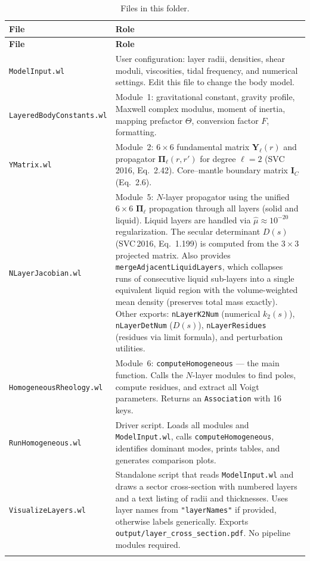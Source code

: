\documentclass[11pt]{article}
\begin{document}
\begin{longtable}{@{}lp{8.5cm}@{}}
\toprule
\textbf{File} & \textbf{Role} \\
\midrule
\endfirsthead
\toprule
\textbf{File} & \textbf{Role} \\
\midrule
\endhead
\texttt{ModelInput.wl} &
  User configuration: layer radii, densities, shear moduli,
  viscosities, tidal frequency, and numerical settings.  Edit this
  file to change the body model. \\[4pt]
\texttt{LayeredBodyConstants.wl} &
  Module~1: gravitational constant, gravity profile, Maxwell complex
  modulus, moment of inertia, mapping prefactor $\Theta$, conversion
  factor $F$, formatting. \\[4pt]
\texttt{YMatrix.wl} &
  Module~2: $6\times6$ fundamental matrix $\mathbf{Y}_\ell(r)$
  and propagator $\mathbf{\Pi}_\ell(r,r')$ for degree
  $\ell=2$ (SVC\,2016, Eq.~2.42).  Core--mantle boundary matrix
  $\mathbf{I}_C$ (Eq.~2.6). \\[4pt]
\texttt{NLayerJacobian.wl} &
  Module~5: $N$-layer propagator using the unified $6\times6$
  $\mathbf{\Pi}_\ell$ propagation through all layers (solid and
  liquid).  Liquid layers are handled via $\hat\mu \approx 10^{-20}$
  regularization.  The secular determinant $D(s)$
  (SVC\,2016, Eq.~1.199) is computed from the $3\times3$ projected
  matrix.  Also provides \texttt{mergeAdjacentLiquidLayers}, which
  collapses runs of consecutive liquid sub-layers into a single
  equivalent liquid region with the volume-weighted mean density
  (preserves total mass exactly).  Other exports:
  \texttt{nLayerK2Num} (numerical $k_2(s)$),
  \texttt{nLayerDetNum} ($D(s)$), \texttt{nLayerResidues}
  (residues via limit formula), and perturbation utilities. \\[4pt]
\texttt{HomogeneousRheology.wl} &
  Module~6: \texttt{computeHomogeneous} --- the main function.  Calls
  the $N$-layer modules to find poles, compute residues, and extract
  all Voigt parameters.  Returns an \texttt{Association} with 16
  keys. \\[4pt]
\texttt{RunHomogeneous.wl} &
  Driver script.  Loads all modules and \texttt{ModelInput.wl},
  calls \texttt{computeHomogeneous}, identifies dominant modes, prints
  tables, and generates comparison plots. \\[4pt]
\texttt{VisualizeLayers.wl} &
  Standalone script that reads \texttt{ModelInput.wl} and draws a
  sector cross-section with numbered layers and a text listing of
  radii and thicknesses.  Uses layer names from
  \texttt{"layerNames"} if provided, otherwise labels generically.
  Exports \texttt{output/layer\_cross\_section.pdf}.  No pipeline
  modules required. \\
\bottomrule
\caption{Files in this folder.}
\label{tab:files}
\end{longtable}
\end{document}
